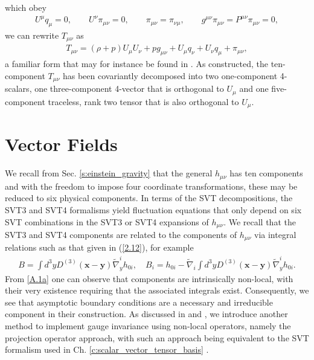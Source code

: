 %
which obey
%
\begin{eqnarray}
U^{\mu}q_{\mu}=0,\qquad U^{\nu}\pi_{\mu\nu}=0,\qquad \pi_{\mu\nu}=\pi_{\nu\mu},\qquad g^{\mu\nu}\pi_{\mu\nu}=P^{\mu\nu}\pi_{\mu\nu}=0,
\label{E5}
\end{eqnarray}
%
we can rewrite $T_{\mu\nu}$ as
%
\begin{eqnarray}
T_{\mu\nu}=(\rho+p)U_{\mu}U_{\nu}+pg_{\mu\nu}+U_{\mu}q_{\nu}+U_{\nu}q_{\mu}+\pi_{\mu\nu},
\label{E6}
\end{eqnarray}
%
a familiar form that may for instance be found in \cite{ellis_maartens_maccallum_2009}. As constructed, the ten-component $T_{\mu\nu}$ has been covariantly decomposed into two one-component 4-scalars, one three-component  4-vector that is orthogonal to $U_{\mu}$ and one five-component traceless, rank two tensor that is also orthogonal  to $U_{\mu}$.

\section{Vector Fields}
\label{aas:vector_fields}

We recall from Sec. \ref{s:einstein_gravity} that the general $h_{\mu\nu}$ has ten components and with the freedom to impose four coordinate transformations, these may be reduced to six physical components. In terms of the SVT decompositions, the SVT3 and SVT4 formalisms yield fluctuation equations that only depend on six SVT combinations in the SVT3 or SVT4 expansions of $h_{\mu\nu}$. We recall that the SVT3 and SVT4 components are related to the components of $h_{\mu\nu}$ via integral relations such as that given in (\ref{2.12}), for example
%
\begin{eqnarray}
B=\int d^3yD^{(3)}(\mathbf{x}-\mathbf{y})\tilde{\nabla}_y^ih_{0i},\quad B_i=h_{0i}-\tilde{\nabla}_i\int d^3yD^{(3)}(\mathbf{x}-\mathbf{y})\tilde{\nabla}_y^ih_{0i}.
\label{A.1a}
\end{eqnarray}
%
From \eqref{A.1a} one can observe that components are intrinsically non-local, with their very existence requiring that the associated integrals exist. Consequently, we see that asymptotic boundary conditions are a necessary and irreducible component in their construction. As discussed in \cite{mannheim_2005} and \cite{amarasinghe_2019}, we introduce another method to implement gauge invariance using non-local operators, namely the projection operator approach, with such an approach being equivalent to the SVT formalism used in Ch. \ref{c:scalar_vector_tensor_basis} .


